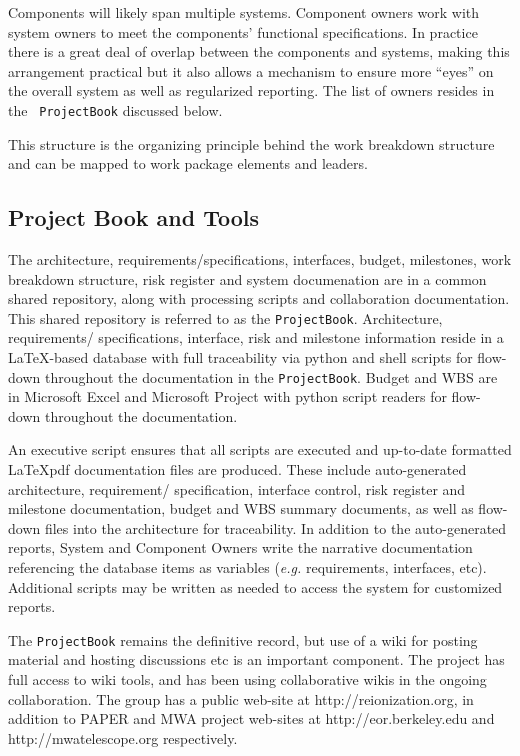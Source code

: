 \documentclass[preprint]{aastex}
\begin{document}
Components will likely span multiple systems. Component owners work with system
owners to meet the components' functional specifications. In practice there is a
great deal of overlap between the components and systems, making this arrangement
practical but it also allows a mechanism to ensure more ``eyes'' on the overall
system as well as regularized reporting. The list of owners resides in the {\tt
ProjectBook} discussed below.

This structure is the organizing principle behind the work breakdown structure and
can be mapped to work package elements and leaders.

\subsection{Project Book and Tools}
The architecture, requirements/specifications, interfaces, budget, milestones, work
breakdown structure, risk register and system documenation are in a common
shared repository, along with processing scripts and collaboration documentation.
This shared repository is referred to as the {\tt ProjectBook}. Architecture,
requirements/ specifications, interface, risk and milestone information reside in a
\LaTeX-based database with full traceability via python and shell scripts for
flow-down throughout the documentation in the {\tt ProjectBook}. Budget and WBS are
in Microsoft Excel and Microsoft Project with python script readers for flow-down
throughout the documentation.

An executive script ensures that all scripts are executed and up-to-date formatted
\LaTeX pdf documentation files are produced. These include auto-generated
architecture, requirement/ specification, interface control, risk register and
milestone documentation, budget and WBS summary documents, as well as flow-down files
into the architecture for traceability. In addition to the auto-generated reports,
System and Component Owners write the narrative documentation referencing the
database items as variables ({\em e.g.} requirements, interfaces, etc). Additional
scripts may be written as needed to access the system for customized reports.

The {\tt ProjectBook} remains the definitive record, but use of a wiki for posting material and hosting
discussions etc is an important component.  The project has full access to wiki tools, and has been
using collaborative wikis in the ongoing collaboration.  The group has a public web-site at http://reionization.org, 
in addition to PAPER and MWA project web-sites at http://eor.berkeley.edu and http://mwatelescope.org respectively.
\end{document}
